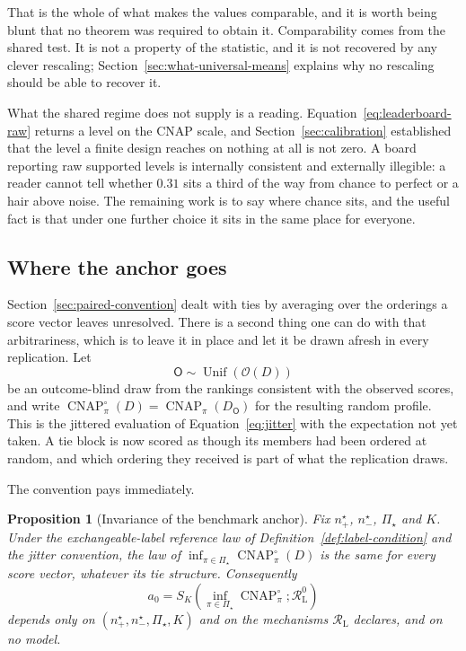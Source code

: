 \documentclass[11pt]{article}
\newcommand{\CNAP}{\operatorname{CNAP}}
\newcommand{\Regime}{\mathcal{R}}
\newcommand{\PSet}{\Pi_\star}
\newcommand{\Rank}{\mathsf{O}}
\newcommand{\CNAPj}{\CNAP^{\circ}}
\newcommand{\RegimeL}{\Regime_{\mathrm{L}}}
\newcommand{\Unif}{\operatorname{Unif}}
\newtheorem{proposition}{Proposition}
\theoremstyle{remark}
\begin{document}
That is the whole of what makes the values comparable, and it is worth being blunt that no theorem was required to obtain it. Comparability comes from the shared test. It is not a property of the statistic, and it is not recovered by any clever rescaling; Section~\ref{sec:what-universal-means} explains why no rescaling should be able to recover it.

What the shared regime does not supply is a reading. Equation~\eqref{eq:leaderboard-raw} returns a level on the CNAP scale, and Section~\ref{sec:calibration} established that the level a finite design reaches on nothing at all is not zero. A board reporting raw supported levels is internally consistent and externally illegible: a reader cannot tell whether $0.31$ sits a third of the way from chance to perfect or a hair above noise. The remaining work is to say where chance sits, and the useful fact is that under one further choice it sits in the same place for everyone.

\subsection{Where the anchor goes}
\label{sec:common-anchor}

Section~\ref{sec:paired-convention} dealt with ties by averaging over the orderings a score vector leaves unresolved. There is a second thing one can do with that arbitrariness, which is to leave it in place and let it be drawn afresh in every replication. Let
\[
\Rank\sim\Unif\left(\mathcal{O}(D)\right)
\]
be an outcome-blind draw from the rankings consistent with the observed scores, and write $\CNAPj_\pi(D)=\CNAP_\pi(D_{\Rank})$ for the resulting random profile. This is the jittered evaluation of Equation~\eqref{eq:jitter} with the expectation not yet taken. A tie block is now scored as though its members had been ordered at random, and which ordering they received is part of what the replication draws.

The convention pays immediately.

\begin{proposition}[Invariance of the benchmark anchor]
\label{prop:anchor-invariance}
Fix $n^\star_+$, $n^\star_-$, $\PSet$ and $K$. Under the exchangeable-label reference law of Definition~\ref{def:label-condition} and the jitter convention, the law of $\inf_{\pi\in\PSet}\CNAPj_\pi(D)$ is the same for every score vector, whatever its tie structure. Consequently
\begin{equation}
a_0
=
S_K
\left(
\inf_{\pi\in\PSet}\CNAPj_\pi;
\RegimeL^{0}
\right)
\label{eq:common-anchor}
\end{equation}
depends only on $(n^\star_+,n^\star_-,\PSet,K)$ and on the mechanisms $\RegimeL$ declares, and on no model.
\end{proposition}
\end{document}

